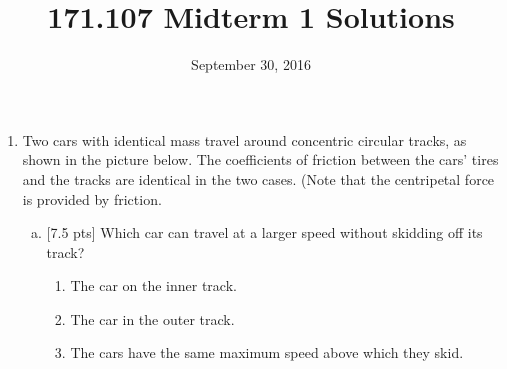 \documentclass{article}[10pt]
\title{171.107 Midterm 1 Solutions}
\date{September 30, 2016}
\begin{document}
\maketitle

  
\begin{enumerate}

\item  Two cars with identical mass travel around concentric circular tracks, as shown in the picture below. The coefficients of friction between the
cars' tires and the tracks are identical in the two cases. (Note that the centripetal force is provided by friction. 

\begin{center}
\end{center}

\begin{enumerate}[(a)]

\item {[}7.5 pts] \label{question:1:a} Which car can travel at a larger speed without skidding off its track?

\begin{enumerate}[i]

\item The car on the inner track.

\item The car in the outer track.

\item The cars have the same maximum speed above which they skid.


\end{enumerate}
\end{enumerate}
\end{enumerate}
\end{document}

